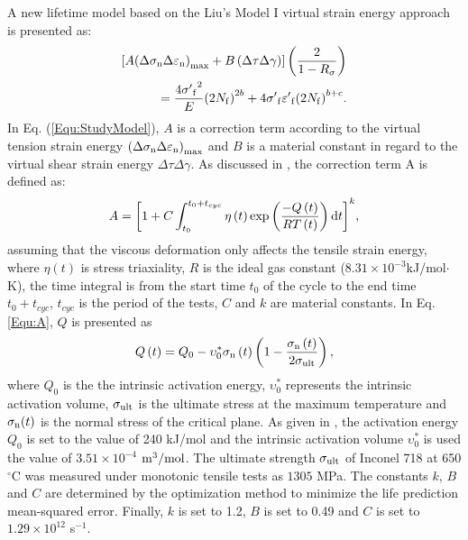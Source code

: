 \documentclass[preprint,5p,twocolumn,11pt,sort&compress]{elsarticle}
\begin{document}
A new lifetime model based on the Liu's Model I virtual strain energy approach is presented as:
\begin{equation}
\begin{aligned}
\left[ {A{{\left( {\Delta {\sigma _{\rm n}}\Delta {\varepsilon _{\rm n}}} \right)}_{\max }} + B\left( {\Delta \tau \Delta \gamma } \right)} \right]\left( {\frac{2}{{1 - {R_\sigma }}}} \right)\\
= \frac{{4{{\sigma '}_{\rm f}}^2}}{E}{\left( {2{N_{\rm f}}} \right)^{2b}} + 4{{\sigma '}_{\rm f}}{{\varepsilon '}_{\rm f}}{\left( {2{N_{\rm f}}} \right)^{b + c}}.
\end{aligned}
\label{Equ:StudyModel}
\end{equation}
In Eq. (\ref{Equ:StudyModel}), $A$ is a correction term according to the virtual tension strain energy ${{\left( {\Delta {\sigma _{\rm n}}\Delta {\varepsilon _{\rm n}}} \right)}_{\max }}$ and $B$ is a material constant in regard to the virtual shear strain energy ${\Delta \tau \Delta \gamma }$.
As discussed in \cite{Vose2013}, the correction term A is defined as:
\begin{equation}
A = {\left[ {1 + C\int_{{t_0}}^{{t_0} + {t_{cyc}}} {\eta \left( t \right)\exp \left( {\frac{{ - Q\left( t \right)}}{{RT\left( t \right)}}} \right){\rm{d}}t} } \right]^k},
\label{Equ:A}
\end{equation}
assuming that the viscous deformation only affects the tensile strain energy, where $\eta \left( t \right)$ is stress triaxiality, $R$ is the ideal gas constant ($8.31\times10^{-3}$kJ/mol$\cdot$K), the time integral is from the start time $t_0$ of the cycle to the end time $t_0 + t_{cyc}$, $t_{cyc}$ is the period of the tests, $C$ and $k$ are material constants.
In Eq. \ref{Equ:A}, $Q$ is presented \cite{Warren2006,Warren2008} as
\begin{equation}
Q\left( t \right) = {Q_0} - \upsilon _0^*{\sigma _{\rm n}}\left( t \right)\left( {1 - \frac{{{\sigma _{\rm n}}\left( t \right)}}{{2{\sigma _{\rm ult}}}}} \right),
\label{Equ:creep_activation_energy}
\end{equation}
where $Q_0$ is the the intrinsic activation energy, $\upsilon _0^*$ represents the intrinsic activation volume, $\sigma_{\rm ult}$ is the ultimate stress at the maximum temperature and $\sigma_{\rm n}(t)$ is the normal stress of the critical plane.
As given in \cite{Warren2008}, the activation energy $Q_0$ is set to the value of 240 kJ/mol and the intrinsic activation volume $\upsilon _0^*$ is used the value of $3.51\times10^{-4}$ $\rm{m}^{3}/\rm{mol}$. The ultimate strength $\sigma_{\rm ult}$ of Inconel 718 at 650$^\circ$C was measured under monotonic tensile tests as $1305$ MPa. The constants $k$, $B$ and $C$ are determined by the optimization method to minimize the life prediction mean-squared error. Finally, $k$ is set to 1.2, $B$ is set to 0.49 and $C$ is set to $1.29\times10^{12}$ s$^{-1}$.
\end{document}
